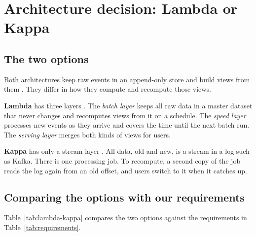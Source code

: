 \section{Architecture decision: Lambda or Kappa}

\subsection{The two options}
Both architectures keep raw events in an append-only store and build views from them \cite{kleppmann2017}. They differ in how
they compute and recompute those views.

\textbf{Lambda} has three layers \cite{marz2015}. The \emph{batch layer} keeps all raw data in a master
dataset that never changes and recomputes views from it on a schedule. The \emph{speed layer} processes
new events as they arrive and covers the time until the next batch run. The \emph{serving layer} merges
both kinds of views for users.

\textbf{Kappa} has only a stream layer \cite{kreps2014}. All data, old and new, is a stream in a log such
as Kafka. There is one processing job. To recompute, a second copy of the job reads the log again from an
old offset, and users switch to it when it catches up.

\subsection{Comparing the options with our requirements}
Table~\ref{tab:lambda-kappa} compares the two options against the requirements in
Table~\ref{tab:requirements}.

